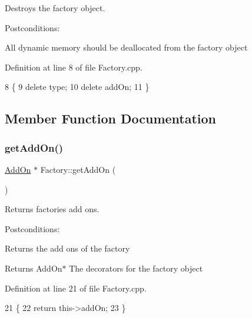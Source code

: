 Destroys the factory object. 

Postconditions\+:
\begin{DoxyItemize}
\item All dynamic memory should be deallocated from the factory object 
\end{DoxyItemize}

Definition at line 8 of file Factory.\+cpp.


\begin{DoxyCode}
8                   \{
9     \textcolor{keyword}{delete} type;
10     \textcolor{keyword}{delete} addOn;
11 \}
\end{DoxyCode}


\subsection{Member Function Documentation}
\mbox{\label{classFactory_a994153930f59cafb280e91d5b100b5aa}} 
\subsubsection{\texorpdfstring{get\+Add\+On()}{getAddOn()}}
{\footnotesize\ttfamily \hyperlink{classAddOn}{Add\+On} $\ast$ Factory\+::get\+Add\+On (\begin{DoxyParamCaption}{ }\end{DoxyParamCaption})}



Returns factories add ons. 

Postconditions\+:
\begin{DoxyItemize}
\item Returns the add ons of the factory
\end{DoxyItemize}

\begin{DoxyReturn}{Returns}
Add\+On$\ast$ The decorators for the factory object 
\end{DoxyReturn}


Definition at line 21 of file Factory.\+cpp.


\begin{DoxyCode}
21                          \{
22     \textcolor{keywordflow}{return} this->addOn;
23 \}
\end{DoxyCode}
\mbox{\label{classFactory_ac91051006ace7ec5bb6ecf0fe6d02d58}} 
